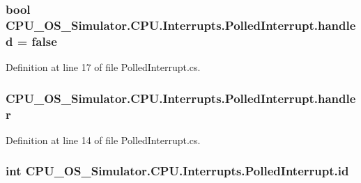 \subsubsection[{handled}]{\setlength{\rightskip}{0pt plus 5cm}bool C\+P\+U\+\_\+\+O\+S\+\_\+\+Simulator.\+C\+P\+U.\+Interrupts.\+Polled\+Interrupt.\+handled = false\hspace{0.3cm}{\ttfamily [private]}}\label{class_c_p_u___o_s___simulator_1_1_c_p_u_1_1_interrupts_1_1_polled_interrupt_a25751ed2a2b610d3883e8c6e7197d89d}


Definition at line 17 of file Polled\+Interrupt.\+cs.

\hypertarget{class_c_p_u___o_s___simulator_1_1_c_p_u_1_1_interrupts_1_1_polled_interrupt_ae7228477097987fa61e837479bad2696}{}
\subsubsection[{handler}]{ C\+P\+U\+\_\+\+O\+S\+\_\+\+Simulator.\+C\+P\+U.\+Interrupts.\+Polled\+Interrupt.\+handler\hspace{0.3cm}{\ttfamily [private]}}\label{class_c_p_u___o_s___simulator_1_1_c_p_u_1_1_interrupts_1_1_polled_interrupt_ae7228477097987fa61e837479bad2696}


Definition at line 14 of file Polled\+Interrupt.\+cs.

\hypertarget{class_c_p_u___o_s___simulator_1_1_c_p_u_1_1_interrupts_1_1_polled_interrupt_ae44966c8438ace0a6cb6ac5d670b391b}{}
\subsubsection[{id}]{\setlength{\rightskip}{0pt plus 5cm}int C\+P\+U\+\_\+\+O\+S\+\_\+\+Simulator.\+C\+P\+U.\+Interrupts.\+Polled\+Interrupt.\+id\hspace{0.3cm}{\ttfamily [private]}}\label{class_c_p_u___o_s___simulator_1_1_c_p_u_1_1_interrupts_1_1_polled_interrupt_ae44966c8438ace0a6cb6ac5d670b391b}


